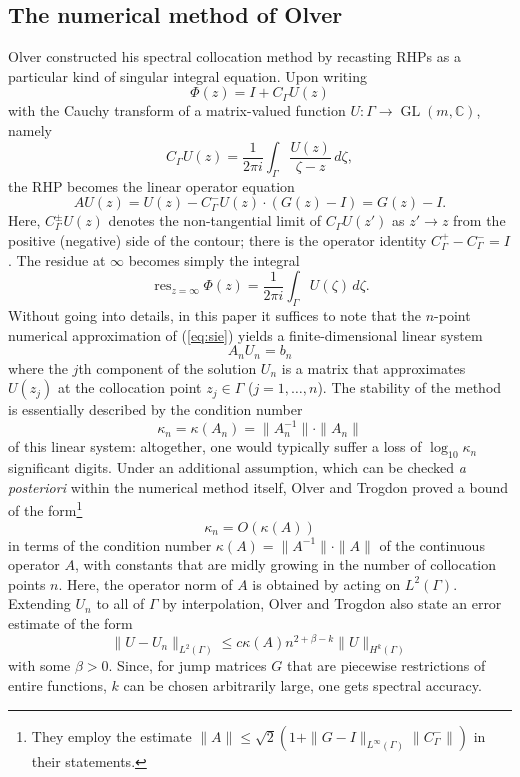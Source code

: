 \documentclass[reqno]{amsart}
\renewcommand{\leq}{\leqslant}
\newcommand{\C}{\mathbb{C}}
\DeclareMathOperator*{\res}{res}
\DeclareMathOperator*{\GL}{GL}
\begin{document}
\subsection*{The numerical method of Olver} Olver \cite{Olver:2011:NSR:1967343.1967345} constructed his
spectral collocation method by recasting RHPs as a particular kind of singular integral equation. Upon
writing
\[
\Phi(z) = I + C_\Gamma U(z)
\]
with the Cauchy transform of a matrix-valued function $U : \Gamma \to \GL(m,\C)$, namely
\[
C_\Gamma U(z) = \frac{1}{2\pi i} \int_\Gamma \frac{U(z)}{\zeta - z}\,d\zeta,
\]
the RHP becomes the linear operator equation
\begin{equation}\label{eq:sie}
A U (z) = U(z) - C_\Gamma^- U(z) \cdot (G(z)-I) = G(z)-I. 
\end{equation}
Here, $C_\Gamma^\pm U(z)$ denotes the non-tangential limit of $C_\Gamma U(z')$ as $z' \to z$ from the positive (negative) side of the contour; there is the operator identity $C_\Gamma^+ - C_\Gamma^- = I$. The residue at $\infty$ becomes
simply the integral
\[
\res_{z=\infty} \Phi(z) = \frac{1}{2\pi i}\int_{\Gamma} U(\zeta)\,d\zeta.
\]
Without going into details, in this paper it suffices to note that the $n$-point numerical approximation of
(\ref{eq:sie}) yields a finite-dimensional linear system
\[
A_n U_n = b_n
\]
where the $j$th component of the solution $U_n$ is a matrix that approximates $U(z_j)$ at the collocation point $z_j \in \Gamma$ ($j=1,\ldots,n$). The stability of the method is essentially described by the condition number 
\[
\kappa_n = \kappa(A_n) = \|A_n^{-1}\|\cdot \|A_n\| 
\]
of this linear system: altogether, one would typically suffer a loss of $\log_{10}\kappa_n$ significant digits.
Under an additional assumption, which can be checked {\em a posteriori} within the numerical
method itself, Olver and Trogdon \cite[Assumpt.~6.1 and Lemma~6.1]{1205.5604} proved a bound of the form\footnote{They employ
the estimate $\|A\| \le \sqrt 2(1+ \|G-I\|_{L^\infty(\Gamma)}\|C_\Gamma^-\|)$ in their statements.}
\[
\kappa_n = O(\kappa(A)) 
\]
in terms of the condition number $\kappa(A) = \|A^{-1}\|\cdot \|A\|$ of the continuous operator $A$, 
with constants that are midly growing in the number of collocation points $n$. Here, the operator norm of $A$
is obtained by acting on $L^2(\Gamma)$. Extending $U_n$ to all of $\Gamma$ by interpolation, Olver and
Trogdon \cite[Eq.~(6.1)]{1205.5604} also state an error estimate of the form
\[
\|U-U_n\|_{L^2(\Gamma)} \leq c \kappa(A) n^{2+\beta-k} \|U\|_{H^k(\Gamma)}
\]
with some $\beta > 0$. Since, for jump matrices $G$ that are piecewise restrictions of
entire functions, $k$ can be chosen arbitrarily large, one gets spectral accuracy. 
\end{document}
